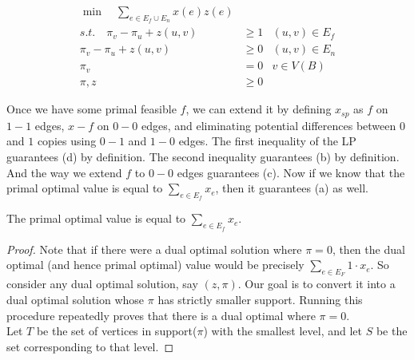 \documentclass[./main.tex]{subfiles}
\begin{document}
	\hfill\vline\hfill
	\begin{minipage}{0.50\textwidth}
	\begin{align*}
		\min\quad\sum_{e\in E_f\cup E_n}x(e)z(e)\\
		s.t.\quad \pi_v - \pi_u + z(u,v)&\geq 1 &(u,v)\in E_f\\
		\pi_v - \pi_u + z(u,v)&\geq 0 &(u,v)\in E_n\\
		\pi_v &= 0 &v\in V(B)\\
		\pi, z&\geq 0
	\end{align*}
	\end{minipage}

Once we have some primal feasible $f$, we can extend it by defining $x_{sp}$ as $f$ on $1-1$ edges, $x-f$ on $0-0$ edges, and eliminating potential differences between $0$ and $1$ copies using $0-1$ and $1-0$ edges. 
The first inequality of the LP guarantees (d) by definition. 
The second inequality guarantees (b) by definition. And the way we extend $f$ to $0-0$ edges guarantees (c). 
Now if we know that the primal optimal value is equal to $\sum_{e\in E_f}x_e$, then it guarantees (a) as well.\vspace{2mm}
	\begin{claim}
		The primal optimal value is equal to $\sum_{e\in E_f}x_e$.
	\end{claim}
	\begin{proof}
		Note that if there were a dual optimal solution where $\pi = 0$, then the dual optimal (and hence primal optimal) value would be precisely $\sum_{e\in E_F}1\cdot x_e$. 
		So consider any dual optimal solution, say $(z,\pi)$. Our goal is to convert it into a dual optimal solution whose $\pi$ has strictly smaller support. 
		Running this procedure repeatedly proves that there is a dual optimal where $\pi = 0$.\vspace{2mm}
		\\Let $T$ be the set of vertices in support($\pi$) with the smallest level, and let $S$ be the set corresponding to that level.
		
	\end{proof}
\end{document}
